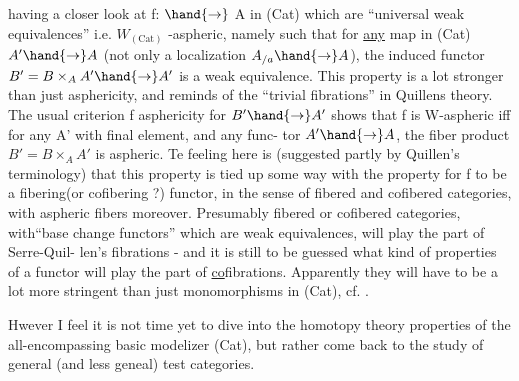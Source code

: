 having a closer look at  f: $\hand{\to}$ A in (Cat) which are ``universal
weak equivalences'' i.e. $W_{(\mathrm{Cat})}$ -aspheric, namely such that for \uline{any} map
in (Cat) $A'\hand{\to}A$ (not only a localization $A_{/a}\hand{\to}A$), the induced
functor $B'=B\times_A A'\hand{\to}A'$ is a weak equivalence. This property is a lot
stronger than just asphericity, and reminds of the ``trivial fibrations''
in Quillens theory. The usual criterion f asphericity for $B'\hand{\to}A'$ shows
that f is W-aspheric iff  for any A' with final element, and any func-%
tor $A'\hand{\to}A$, the fiber product $B'=B\times_A A'$ is aspheric. Te feeling here is
(suggested partly by Quillen's terminology) that this property is tied up
some way with the property for f to be a fibering(or cofibering ?) functor,
in the sense of fibered and cofibered categories, with aspheric fibers
moreover. Presumably fibered or cofibered categories, with``base change
functors'' which are weak equivalences, will play the part of Serre-Quil-%
len's fibrations - and it is still to be guessed what kind of 
properties of a functor will play the part of \uline{co}fibrations. Apparently
they will have to be a lot more stringent than just monomorphisms in (Cat),
cf.  .

Hwever I feel it is not time yet to dive into the homotopy theory
properties of the all-encompassing basic modelizer (Cat), but rather come
back to the study of general (and less geneal) test categories.

